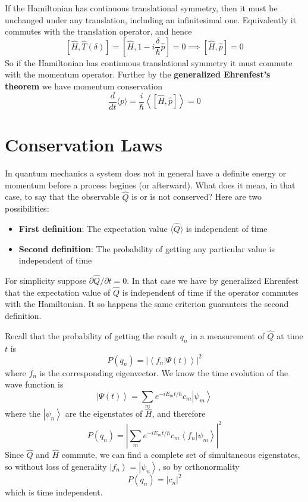 \documentclass[12pt, a4paper, oneside, openright, titlepage]{book}
\newcommand{\ket}[1]{\left\vert#1\right\rangle}
\newcommand{\braket}[2]{\left\langle#1\right\vert\left.#2\right\rangle}
\begin{document}
If the Hamiltonian has continuous translational symmetry, then it must be unchanged under any translation, including an infinitesimal one. Equivalently it commutes with the translation operator, and hence \begin{equation*}
    \left[\hat{H},\hat{T}(\delta)\right] = \left[\hat{H},1-i\frac{\delta}{\hbar}\hat{p}\right] = 0\implies \left[\hat{H},\hat{p}\right] = 0
\end{equation*}
So if the Hamiltonian has continuous translational symmetry it must commute with the momentum operator. Further by the \textbf{generalized Ehrenfest's theorem} we have momentum conservation \begin{equation*}
    \frac{d}{dt}\langle p\rangle = \frac{i}{\hbar}\left\langle \left[\hat{H},\hat{p}\right]\right\rangle = 0
\end{equation*}



\section{Conservation Laws}

In quantum mechanics a system does not in general have a definite energy or momentum before a process begines (or afterward). What does it mean, in that case, to say that the observable $\hat{Q}$ is or is not conserved? Here are two possibilities: \begin{itemize}
    \item \textbf{First definition}: The expectation value $\langle \hat{Q}\rangle$ is independent of time
    \item \textbf{Second definition}: The probability of getting any particular value is independent of time
\end{itemize}
For simplicity suppose $\partial \hat{Q}/\partial t = 0$. In that case we have by generalized Ehrenfest that the expectation value of $\hat{Q}$ is independent of time if the operator commutes with the Hamiltonian. It so happens the same criterion guarantees the second definition.

Recall that the probability of getting the result $q_n$ in a measurement of $\hat{Q}$ at time $t$ is \begin{equation*}
    P(q_n) = |\braket{f_n}{\Psi(t)}|^2
\end{equation*}
where $f_n$ is the corresponding eigenvector. We know the time evolution of the wave function is \begin{equation*}
    \ket{\Psi(t)} = \sum_me^{-iE_mt/\hbar}c_m\ket{\psi_m}
\end{equation*}
where the $\ket{\psi_n}$ are the eigenstates of $\hat{H}$, and therefore \begin{equation*}
    P(q_n) = \left|\sum_me^{-iE_mt/\hbar}c_m\braket{f_n}{\psi_m}\right|^2
\end{equation*}
Since $\hat{Q}$ and $\hat{H}$ commute, we can find a complete set of simultaneous eigenstates, so without loss of generality $\ket{f_n} = \ket{\psi_n}$, so by orthonormality \begin{equation*}
    P(q_n) = |c_n|^2
\end{equation*}
which is time independent.
\end{document}
